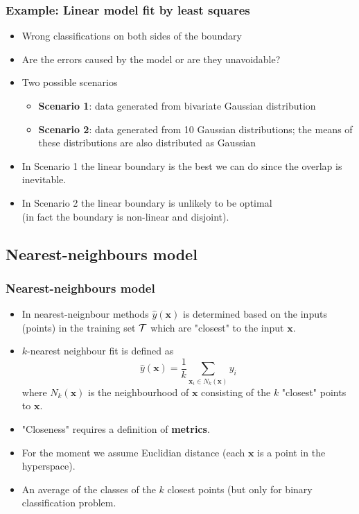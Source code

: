 \documentclass[notes]{beamer}          %
\newcommand{\vect}[1]{\bm{#1}}
\begin{document}
\begin{frame}
\frametitle{Example: Linear model fit by least squares}
\begin{itemize}
    \item Wrong classifications on both sides of the boundary
    \item Are the errors caused by the model or are they unavoidable?
    \item Two possible scenarios
        \begin{itemize}
            \item {\bf Scenario 1}: data generated from bivariate Gaussian distribution
            \item {\bf Scenario 2}: data generated from 10 Gaussian distributions; the means of these distributions are also distributed as Gaussian
        \end{itemize}
    \item In Scenario 1 the linear boundary is the best we can do since the overlap is inevitable.
    \item In Scenario 2 the linear boundary is unlikely to be optimal \\
          (in fact the boundary is non-linear and disjoint).
\end{itemize}

\end{frame}
\fi

\subsection{Nearest-neighbours model}

\begin{frame}
\frametitle{Nearest-neighbours model}
    \begin{itemize}
        \item In nearest-neignbour methods $\hat{y}(\vect{x})$ is determined based on the inputs (points) in the training set $\cal{T}$ which are "closest" to the input $\vect{x}$.
        \item $k$-nearest neighbour fit is defined as
        $$ \hat{y}(\vect{x}) = \frac{1}{k} \sum_{\vect{x}_i \in N_k(\vect{x})} y_i $$
        where $N_k(\vect{x})$ is the neighbourhood of $\vect{x}$ consisting of the $k$ "closest" points to $\vect{x}$.
        \item "Closeness" requires a definition of {\bf metrics}.
        \item For the moment we assume Euclidian distance (each $\vect{x}$ is a point in the hyperspace).
        \item An average of the classes of the $k$ closest points (but only for binary classification problem.
    \end{itemize}
\end{frame}
\end{document}

